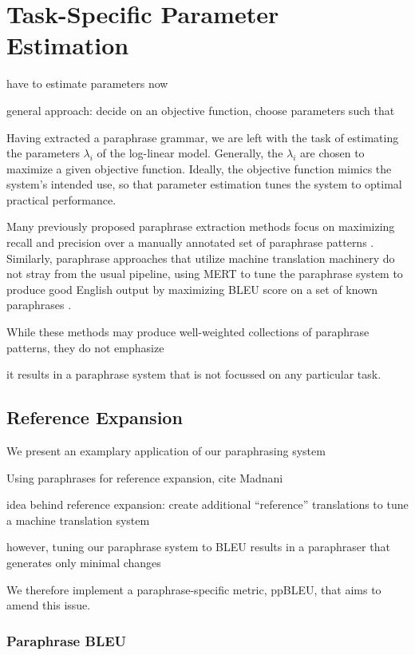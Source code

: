 \documentclass[11pt]{article}
\newcommand{\mnote}[1]{\marginpar{%
  \vskip-\baselineskip
  \raggedright\footnotesize
  \itshape\hrule\smallskip\tiny{#1}\par\smallskip\hrule}}
\begin{document}
\section{Task-Specific Parameter Estimation} 
\label{adaptation}

have to estimate parameters now

general approach: decide on an objective function, choose parameters
such that

Having extracted a paraphrase grammar, we are left with the task of
estimating the parameters $\lambda_i$ of the log-linear
model. Generally, the $\lambda_i$ are chosen to maximize a given
objective function. Ideally, the objective function mimics the
system's intended use, so that parameter estimation tunes the system
to optimal practical performance.

Many previously proposed paraphrase extraction methods focus on
maximizing recall and precision over a manually annotated set of
paraphrase patterns \cite{Zhao2008,Bhagat2008}.  Similarly, paraphrase
approaches that utilize machine translation machinery do not stray
from the usual pipeline, using MERT \cite{Och2003} to tune the
paraphrase system to produce good English output by maximizing BLEU
score on a set of known paraphrases \cite{Madnani2007}.

While these methods may produce well-weighted collections of
paraphrase patterns, they do not emphasize 

it results in a paraphrase system that is not
focussed on any particular task.



\subsection{Reference Expansion}

We present an examplary application of our paraphrasing system

Using paraphrases for reference expansion, cite Madnani

idea behind reference expansion: create additional ``reference''
translations to tune a machine translation system

however, tuning our paraphrase system to BLEU results in a paraphraser
that generates only minimal changes \mnote{if so, how did Madnani deal
with that?}

We therefore implement a paraphrase-specific metric, ppBLEU, that aims
to amend this issue.

\subsubsection{Paraphrase BLEU} \label{pp_bleu}
\end{document}
